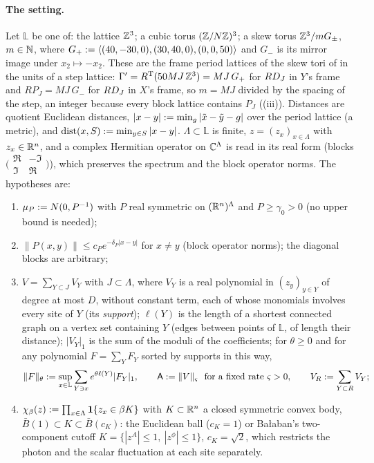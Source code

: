 \paragraph{The setting.} Let $\mathbb{L}$ be one of: the lattice $\mathbb Z^3$; a cubic torus $(\mathbb Z/N\mathbb Z)^3$; a skew torus $\mathbb Z^3/mG_\pm$, $m\in\mathbb N$, where $G_+:=\langle(40,-30,0),(30,40,0),(0,0,50)\rangle$ and $G_-$ is its mirror image under $x_2\mapsto-x_2$. These are the frame period lattices of the skew tori of  in the units of a step lattice: $\Gamma'=R^{\mathrm T}(50MJ\,\mathbb Z^3)=MJ\,G_+$ for $RD_J$ in $Y$'s frame and $RP_J=MJ\,G_-$ for $RD_J$ in $X$'s frame, so $m=MJ$ divided by the spacing of the step, an integer because every block lattice contains $P_J$ ((iii)). Distances are quotient Euclidean distances, $|x-y|:=\min_g|\tilde x-\tilde y-g|$ over the period lattice (a metric), and $\operatorname{dist}(x,S):=\min_{y\in S}|x-y|$. $\Lambda\subset\mathbb{L}$ is finite, $z=(z_x)_{x\in\Lambda}$ with $z_x\in\mathbb R^n$, and a complex Hermitian operator on $\mathbb C^\Lambda$ is read in its real form (blocks $\bigl(\begin{smallmatrix}\Re&-\Im\\\Im&\Re\end{smallmatrix}\bigr)$), which preserves the spectrum and the block operator norms. The hypotheses are:
\begin{enumerate}[label=\textup{(R\arabic*)},leftmargin=*]
\item $\mu_P:= N(0,P^{-1})$ with $P$ real symmetric on $(\mathbb R^n)^\Lambda$ and $P\ge\gamma_0>0$ (no upper bound is needed);
\item $\|P(x,y)\|\le c_Pe^{-\delta_P|x-y|}$ for $x\ne y$ (block operator norms); the diagonal blocks are arbitrary;
\item $V=\sum_{Y\subset J}V_Y$ with $J\subset\Lambda$, where $V_Y$ is a real polynomial in $(z_y)_{y\in Y}$ of degree at most $D$, without constant term, each of whose monomials involves every site of $Y$ (its \emph{support}); $\ell(Y)$ is the length of a shortest connected graph on a vertex set containing $Y$ (edges between points of $\mathbb{L}$, of length their distance); $|V_Y|_1$ is the sum of the moduli of the coefficients; for $\theta\ge0$ and for any polynomial $F=\sum_YF_Y$ sorted by supports in this way,
\[
\|F\|_\theta:=\sup_{x\in\mathbb{L}}\sum_{Y\ni x}e^{\theta\ell(Y)}|F_Y|_1,\qquad\mathsf A:=\|V\|_\varsigma\ \text{ for a fixed rate }\varsigma>0,\qquad V_R:=\sum_{Y\subset R}V_Y;
\]
\item $\chi_\beta(z):=\prod_{x\in\Lambda}\mathbf 1\{z_x\in\beta K\}$ with $K\subset\mathbb R^n$ a closed symmetric convex body, $\bar B(1)\subset K\subset\bar B(c_K)$: the Euclidean ball ($c_K=1$) or Ba{\l}aban's two-component cutoff $K=\{|z^{A}|\le1,\ |z^{\phi}|\le1\}$, $c_K=\sqrt2$, which restricts the photon and the scalar fluctuation at each site separately.
\end{enumerate}
